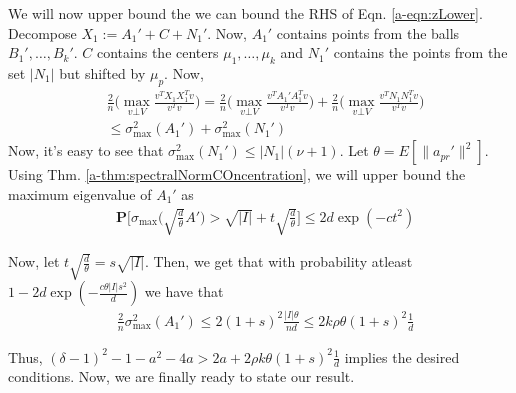 \documentclass[12pt]{article}
\newcommand{\mb}{\mathbf}
\begin{document}
We will now upper bound the we can bound the RHS of Eqn. \ref{a-eqn:zLower}. Decompose $X_1 := A_1' + C + N_1'$. Now, $A_1'$ contains points from the balls $B_1', \ldots, B_k'$. $C$ contains the centers $\mu_1, \ldots, \mu_k$ and $N_1'$ contains the points from the set $|N_1|$ but shifted by $\mu_p$. Now,
\begin{align*}
&\frac{2}{n}\Big(\max_{v\bot V} \frac{v^T X_1X_1^Tv}{v^Tv}\Big) = \frac{2}{n}\Big(\max_{v\bot V} \frac{v^T A_1'A_1^Tv}{v^Tv}\Big) + \frac{2}{n}\Big(\max_{v\bot V} \frac{v^T N_1N_1^Tv}{v^Tv}\Big) \\
&\le \sigma_{\max}^2(A_1') + \sigma_{\max}^2(N_1')
\end{align*}
Now, it's easy to see that $\sigma_{\max}^2(N_1') \le |N_1|(\nu+1)$. Let $\theta = E[\|a_{pr}'\|^2]$. Using Thm. \ref{a-thm:spectralNormCOncentration}, we will upper bound the maximum eigenvalue of $A_1'$ as 
\begin{align}
  &\mb P\bigg[\sigma_{\max}\bigg(\sqrt{\frac{d}{\theta}}A'\bigg) > \sqrt{|I|} + t\sqrt{\frac{d}{\theta}} \bigg] \le 2d\exp(-ct^2)
\end{align}

Now, let $t\sqrt{\frac{d}{\theta}} = s\sqrt{|I|}$. Then, we get that with probability atleast $1-2d\exp(-\frac{c\theta |I|s^2}{d})$ we have that 
\begin{align*}
  &\frac{2}{n}\sigma_{\max}^2(A_1') \le 2(1+s)^2\frac{|I|\theta}{nd} \le 2k\rho\theta (1+s)^2\frac{1}{d}
\end{align*}

Thus, $(\delta-1)^2 -1 - a^2 - 4a > 2a + 2\rho k\theta(1+s)^2\frac{1}{d}$ implies the desired conditions. Now, we are finally ready to state our result.
\end{document}
